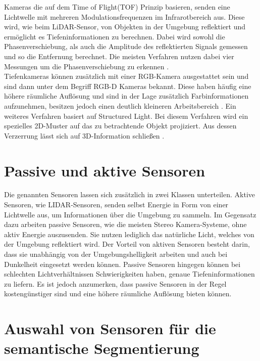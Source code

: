 Kameras die auf dem Time of Flight(TOF) Prinzip basieren, senden eine
Lichtwelle mit mehreren Modulationsfrequenzen im Infrarotbereich aus. Diese
wird, wie beim LiDAR-Sensor, von Objekten in der Umgebung reflektiert und
ermöglicht es Tiefeninformationen zu berechnen. Dabei wird sowohl die
Phasenverschiebung, als auch die Amplitude des reflektierten Signals gemessen
und so die Entfernung berechnet. Die meisten Verfahren nutzen dabei vier
Messungen um die Phasenverschiebung zu erkennen \cite{7035807,7025195}.
\\Tiefenkameras können zusätzlich mit einer RGB-Kamera ausgestattet sein und sind dann unter
dem Begriff RGB-D Kameras bekannt. Diese haben häufig eine höhere räumliche
Auflösung und sind in der Lage zusätzlich Farbinformationen aufzunehmen,
besitzen jedoch einen deutlich kleineren Arbeitsbereich \cite{9262651}. Ein
weiteres Verfahren basiert auf Structured Light. Bei diesem Verfahren wird ein
spezielles 2D-Muster auf das zu betrachtende Objekt projiziert. Aus dessen
Verzerrung lässt sich auf 3D-Information schließen \cite{7992709}.

\section{Passive und aktive Sensoren}
Die genannten Sensoren lassen sich zusätzlich in zwei Klassen unterteilen.
Aktive Sensoren, wie LIDAR-Sensoren, senden selbst Energie in Form von einer
Lichtwelle aus, um Informationen über die Umgebung zu sammeln. Im Gegensatz
dazu arbeiten passive Sensoren, wie die meisten Stereo Kamera-Systeme, ohne
aktiv Energie auszusenden. Sie nutzen lediglich das natürliche Licht, welches
von der Umgebung reflektiert wird. Der Vorteil von aktiven Sensoren besteht
darin, dass sie unabhängig von der Umgebungshelligkeit arbeiten und auch bei
Dunkelheit eingesetzt werden können. Passive Sensoren hingegen können bei
schlechten Lichtverhältnissen Schwierigkeiten haben, genaue Tiefeninformationen
zu liefern. Es ist jedoch anzumerken, dass passive Sensoren in der Regel
kostengünstiger sind und eine höhere räumliche Auflösung bieten können.
\cite{20222324}

\section{Auswahl von Sensoren für die semantische Segmentierung}

